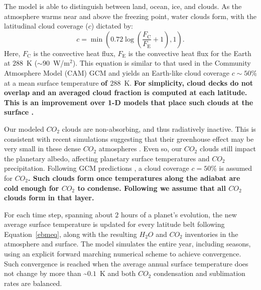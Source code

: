 \documentclass[fleqn,usenatbib]{mnras}
\providecommand{\DIFadd}[1]{{\bf #1}} %
\providecommand{\DIFdel}[1]{} %
\providecommand{\DIFaddbegin}{} %
\providecommand{\DIFaddend}{} %
\providecommand{\DIFdelbegin}{} %
\providecommand{\DIFdelend}{} %
\newcommand{\DIFscaledelfig}{0.5}
\newlength{\DIFdelgraphicswidth} %
\newlength{\DIFdelgraphicsheight} %
\newcommand{\DIFaddincludegraphics}[2][]{{\color{blue}\fbox{\DIFOincludegraphics[#1]{#2}}}} %
\newcommand{\DIFdelincludegraphics}[2][]{%
\sbox{\DIFdelgraphicsbox}{\DIFOincludegraphics[#1]{#2}}%
\settoboxwidth{\DIFdelgraphicswidth}{\DIFdelgraphicsbox} %
\settoboxtotalheight{\DIFdelgraphicsheight}{\DIFdelgraphicsbox} %
\scalebox{\DIFscaledelfig}{%
\parbox[b]{\DIFdelgraphicswidth}{\usebox{\DIFdelgraphicsbox}\\[-\baselineskip] \rule{\DIFdelgraphicswidth}{0em}}\llap{\resizebox{\DIFdelgraphicswidth}{\DIFdelgraphicsheight}{%
\setlength{\unitlength}{\DIFdelgraphicswidth}%
\begin{picture}(1,1)%
\thicklines\linethickness{2pt} %
{\color[rgb]{1,0,0}\put(0,0){\framebox(1,1){}}}%
{\color[rgb]{1,0,0}\put(0,0){\line( 1,1){1}}}%
{\color[rgb]{1,0,0}\put(0,1){\line(1,-1){1}}}%
\end{picture}%
}\hspace*{3pt}}} %
} %
\DeclareRobustCommand{\DIFaddbegin}{\DIFOaddbegin \let\includegraphics\DIFaddincludegraphics} %
\DeclareRobustCommand{\DIFaddend}{\DIFOaddend \let\includegraphics\DIFOincludegraphics} %
\DeclareRobustCommand{\DIFdelbegin}{\DIFOdelbegin \let\includegraphics\DIFdelincludegraphics} %
\DeclareRobustCommand{\DIFdelend}{\DIFOaddend \let\includegraphics\DIFOincludegraphics} %
\begin{document}
The model is able to distinguish between land, ocean, ice, and clouds. As the atmosphere warms near and above the freezing point, water clouds form, with the latitudinal cloud coverage ($c$) dictated by:
\begin{equation}
\label{cloud_coverage}
    c = \min \left ( 0.72 \log \left( \frac{F_{\mathrm{C}}}{F_{\mathrm{E}}} + 1 \right ),1 \right ).
\end{equation}
Here, $F_\mathrm{C}$ is the convective heat flux, $F_\mathrm{E}$ is the convective heat flux for the Earth at $288$~K ($\sim 90$~W/m$^2$). This equation is similar to that used in the Community Atmosphere Model (CAM) GCM \citep{xu1991, yang2014} and yields an Earth-like cloud coverage $c\sim 50 \%$ at a mean surface temperature \DIFdelbegin \DIFdel{$T_{\mathrm{surf}}=288$}\DIFdelend \DIFaddbegin \DIFadd{of $288$}\DIFaddend ~K. \DIFaddbegin \DIFadd{For simplicity, cloud decks do not overlap and an averaged cloud fraction is computed at each latitude. This is an improvement over 1-D models that place such clouds at the surface \citep{kasting1993, KumarKopparapu2013}. 
}\DIFaddend 

Our modeled $CO_{\mathrm{2}}$ clouds are non-absorbing, and thus radiatively inactive. This is consistent with recent simulations suggesting that their greenhouse effect may be very small in these dense $CO_{\mathrm{2}}$ atmospheres \citep{kitzmann2016}. Even so, our $CO_{\mathrm{2}}$ clouds still impact the planetary albedo, affecting planetary surface temperatures and $CO_{\mathrm{2}}$ precipitation. Following GCM predictions \citep{forget2013}, a cloud coverage $c=50 \%$ is assumed for $CO_{\mathrm{2}}$\DIFdelbegin \DIFdel{clouds forming within a given latitude band. }\DIFdelend \DIFaddbegin \DIFadd{. Such clouds form once temperatures along the adiabat are cold enough for $CO_{\mathrm{2}}$ to condense. Following \citep{Williams1997} we assume that all $CO_{\mathrm{2}}$ clouds form in that layer. 
}\DIFaddend 


For each time step, spanning about $2$ hours of a planet's evolution, the new average surface temperature is updated for every latitude belt following Equation~\ref{ebmeq}, along with the resulting $H_{\mathrm{2}}O$ and $CO_{\mathrm{2}}$ inventories in the atmosphere and surface. The model simulates the entire year, including seasons, using an explicit forward marching numerical scheme to achieve convergence. Such convergence is reached when the average annual surface temperature does not change by more than \textasciitilde$0.1$~K and both $CO_{\mathrm{2}}$ condensation and sublimation rates are balanced. 
\end{document}
